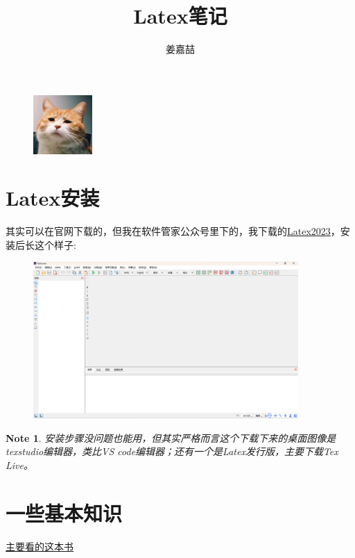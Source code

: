 \documentclass{article}
\title{Latex笔记}
\author{姜嘉喆}
\date{\zhtoday}
\newtheorem{note}{Note}
\begin{document}
	
\maketitle

\graphicspath{{image}}
\begin{figure}[!htb]
\centering
\includegraphics[width=0.2\textwidth]{cat.png}
\end{figure}

\section{Latex安装}
其实可以在官网下载的，但我在软件管家公众号里下的，我下载的\href{https://mp.weixin.qq.com/s/PKXbMBmP8ounwbQE1OiRpw}{Latex2023}，安装后长这个样子:
\begin{figure}[!htb]
\centering
\includegraphics[width=0.9\textwidth]{image/Latex2023.png}
\end{figure}

\begin{note}
    安装步骤没问题也能用，但其实严格而言这个下载下来的桌面图像是texstudio编辑器，类比VS code编辑器；还有一个是Latex发行版，主要下载Tex Live。
\end{note}

\section{一些基本知识}
\href{https://mirrors.tuna.tsinghua.edu.cn/CTAN/info/lshort/chinese/lshort-zh-cn.pdf}{主要看的这本书}
\end{document}
